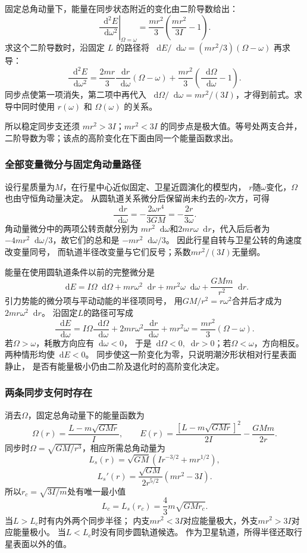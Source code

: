 \documentclass[UTF8,fontset=fandol,a4paper,11pt]{ctexart}
\newcommand{\dd}{\mathop{}\!\mathrm{d}}
\begin{document}
固定总角动量下，能量在同步状态附近的变化由二阶导数给出：
\[
 \left.\frac{\dd^2E}{\dd\omega^2}\right|_{\Omega=\omega}
 =\frac{mr^2}{3}\left(\frac{mr^2}{3I}-1\right).
\]
求这个二阶导数时，沿固定 $L$ 的路径将
$\dd E/\dd\omega=(mr^2/3)(\Omega-\omega)$ 再求导：
\[
 \frac{\dd^2E}{\dd\omega^2}
 =\frac{2mr}{3}\frac{\dd r}{\dd\omega}(\Omega-\omega)
 +\frac{mr^2}{3}\left(\frac{\dd\Omega}{\dd\omega}-1\right).
\]
同步点使第一项消失，第二项中再代入 $\dd\Omega/\dd\omega=mr^2/(3I)$，才得到前式。求导中同时使用 $r(\omega)$ 和 $\Omega(\omega)$ 的关系。

所以稳定同步支还须 $mr^2>3I$；$mr^2<3I$ 的同步点是极大值。等号处两支合并，二阶导数为零；该点的高阶变化在下面由同一个能量函数求出。
\subsubsection*{全部变量微分与固定角动量路径}
设行星质量为$M$，在行星中心近似固定、卫星近圆演化的模型内，
$r$随$\omega$变化，$\Omega$也由守恒角动量决定。
从圆轨道关系微分后保留尚未约去的$r$次方，可得
\[
\frac{\dd r}{\dd\omega}
=-\frac{2\omega r^4}{3GM}
=-\frac{2r}{3\omega}.
\]
角动量微分中的两项公转贡献分别为
$mr^2\dd\omega$和$2mr\omega\dd r$，代入后后者为
$-4mr^2\dd\omega/3$，故它们的总和是
$-mr^2\dd\omega/3$。
因此行星自转与卫星公转的角速度改变量同号，
而轨道半径改变量与它们反号；系数$mr^2/(3I)$无量纲。

能量在使用圆轨道条件以前的完整微分是
\[
\dd E=I\Omega\dd\Omega
+mr\omega^2\dd r+mr^2\omega\dd\omega
+\frac{GMm}{r^2}\dd r.
\]
引力势能的微分项与平动动能的半径项同号，
用$GM/r^2=r\omega^2$合并后才成为$2mr\omega^2\dd r$。
沿固定$L$的路径可写成
\[
\frac{\dd E}{\dd\omega}
=I\Omega\frac{\dd\Omega}{\dd\omega}
+2mr\omega^2\frac{\dd r}{\dd\omega}+mr^2\omega
=\frac{mr^2}{3}(\Omega-\omega).
\]
若$\Omega>\omega$，耗散方向应有$\dd\omega<0$，
于是$\dd\Omega<0,\dd r>0$；若$\Omega<\omega$，方向相反。
两种情形均使$\dd E<0$。
同步使这一阶变化为零，只说明潮汐形状相对行星表面静止，
是否有能量极小仍由二阶及退化时的高阶变化决定。

\subsubsection*{两条同步支何时存在}
消去$\Omega$，固定总角动量下的能量函数为
\[
\Omega(r)=\frac{L-m\sqrt{GMr}}{I},\qquad
E(r)=\frac{[L-m\sqrt{GMr}]^2}{2I}-\frac{GMm}{2r}.
\]
同步时$\Omega=\sqrt{GM/r^3}$，相应所需总角动量为
\[
L_s(r)=\sqrt{GM}\left(Ir^{-3/2}+mr^{1/2}\right),
\]
\[
L_s'(r)=\frac{\sqrt{GM}}{2r^{5/2}}(mr^2-3I).
\]
所以$r_c=\sqrt{3I/m}$处有唯一最小值
\[
L_c=L_s(r_c)=\frac43m\sqrt{GM r_c}.
\]
当$L>L_c$时有内外两个同步半径；
内支$mr^2<3I$对应能量极大，外支$mr^2>3I$对应能量极小。
当$L<L_c$时没有同步圆轨道候选。
作为卫星轨道，所得半径还取行星表面以外的值。
\end{document}
